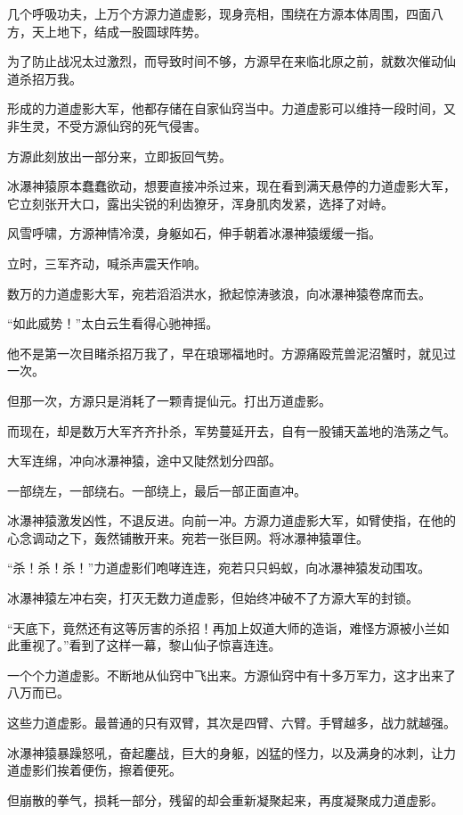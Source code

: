 \begin{this_body}
几个呼吸功夫，上万个方源力道虚影，现身亮相，围绕在方源本体周围，四面八方，天上地下，结成一股圆球阵势。

为了防止战况太过激烈，而导致时间不够，方源早在来临北原之前，就数次催动仙道杀招万我。

形成的力道虚影大军，他都存储在自家仙窍当中。力道虚影可以维持一段时间，又非生灵，不受方源仙窍的死气侵害。

方源此刻放出一部分来，立即扳回气势。

冰瀑神猿原本蠢蠢欲动，想要直接冲杀过来，现在看到满天悬停的力道虚影大军，它立刻张开大口，露出尖锐的利齿獠牙，浑身肌肉发紧，选择了对峙。

风雪呼啸，方源神情冷漠，身躯如石，伸手朝着冰瀑神猿缓缓一指。

立时，三军齐动，喊杀声震天作响。

数万的力道虚影大军，宛若滔滔洪水，掀起惊涛骇浪，向冰瀑神猿卷席而去。

“如此威势！”太白云生看得心驰神摇。

他不是第一次目睹杀招万我了，早在琅琊福地时。方源痛殴荒兽泥沼蟹时，就见过一次。

但那一次，方源只是消耗了一颗青提仙元。打出万道虚影。

而现在，却是数万大军齐齐扑杀，军势蔓延开去，自有一股铺天盖地的浩荡之气。

大军连绵，冲向冰瀑神猿，途中又陡然划分四部。

一部绕左，一部绕右。一部绕上，最后一部正面直冲。

冰瀑神猿激发凶性，不退反进。向前一冲。方源力道虚影大军，如臂使指，在他的心念调动之下，轰然铺散开来。宛若一张巨网。将冰瀑神猿罩住。

“杀！杀！杀！”力道虚影们咆哮连连，宛若只只蚂蚁，向冰瀑神猿发动围攻。

冰瀑神猿左冲右突，打灭无数力道虚影，但始终冲破不了方源大军的封锁。

“天底下，竟然还有这等厉害的杀招！再加上奴道大师的造诣，难怪方源被小兰如此重视了。”看到了这样一幕，黎山仙子惊喜连连。

一个个力道虚影。不断地从仙窍中飞出来。方源仙窍中有十多万军力，这才出来了八万而已。

这些力道虚影。最普通的只有双臂，其次是四臂、六臂。手臂越多，战力就越强。

冰瀑神猿暴躁怒吼，奋起鏖战，巨大的身躯，凶猛的怪力，以及满身的冰刺，让力道虚影们挨着便伤，擦着便死。

但崩散的拳气，损耗一部分，残留的却会重新凝聚起来，再度凝聚成力道虚影。


\end{this_body}
